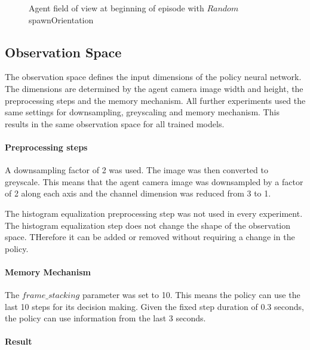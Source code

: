 \begin{figure}
    \centering
    \qquad
    \qquad
    \qquad
    \caption{Agent field of view at beginning of episode with $Random$ spawnOrientation}
    \label{fig:agent_field_of_view}
\end{figure}


\subsection{Observation Space}

The observation space defines the input dimensions of the policy neural network. The dimensions are determined by the agent camera image width and height, the preprocessing steps and the memory mechanism. All further experiments used the same settings for downsampling, greyscaling and memory mechanism. This results in the same observation space for all trained models.

\paragraph{Preprocessing steps}
A downsampling factor of 2 was used. The image was then converted to greyscale. This means that the agent camera image was downsampled by a factor of 2 along each axis and the channel dimension was reduced from 3 to 1.

The histogram equalization preprocessing step was not used in every experiment. The histogram equalization step does not change the shape of the observation space. THerefore it can be added or removed without requiring a change in the policy.

\paragraph{Memory Mechanism}
The $frame\_stacking$ parameter was set to 10. This means the policy can use the last 10 steps for its decision making. Given the fixed step duration of 0.3 seconds, the policy can use information from the last 3 seconds.

\paragraph{Result}

